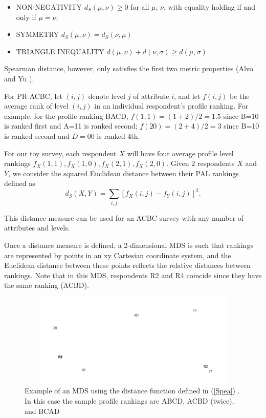 \documentclass[a4paper, 12pt]{article}
\begin{document}
\begin{itemize}
	\item NON-NEGATIVITY $d_S(\mu,\nu)\ge 0$ for all $\mu$, $\nu$, with equality holding if and only if $\mu=\nu$;
	\item SYMMETRY $d_S(\mu,\nu)=d_S(\nu,\mu)$ 
	\item TRIANGLE INEQUALITY $d(\mu,\nu)+d(\nu,\sigma)\ge d(\mu,\sigma)$.
\end{itemize}
{\flushleft Spearman distance}, however, only satisfies the first two metric properties (Alvo and Yu ).

 For PR-ACBC, let $(i,j)$ denote level $j$ of attribute $i$,  and let $f(i,j)$ be the average rank of level $(i,j)$ in an individual respondent's profile ranking. For example, for the profile ranking BACD, $f(1,1)=(1+2)/2=1.5$ since B=10 is ranked first and A=11 is ranked second; $f(20)=(2+4)/2=3$ since B=10 is ranked second and $D=00$ is ranked 4th.

 For our toy survey, each respondent $X$ will have four average profile level rankings $f_X(1,1), f_X(1,0), f_X(2,1), f_X(2,0)$.  Given 2 respondents $X$ and $Y$, we consider the squared Euclidean distance between their PAL rankings defined as
\begin{equation}
d_S(X,Y)=\sum_{i,j} [f_X(i,j)-f_Y(i,j)]^2.
\label{Spea}
\end{equation}

{\flushleft This} distance measure can be used for an ACBC survey with any number of attributes and levels.


Once a distance measure is defined, a 2-dimensional MDS is such that rankings are represented by points in an xy Cartesian coordinate system, and the Euclidean distance between these points reflects the relative distances between rankings.   
Note that in this MDS, respondents R2 and R4 coincide since they have the same ranking (ACBD).   

\begin{figure}[!htpb]
	\centering
	\includegraphics[width=6.5in, height=1.75in]{MDS1.png}
	\caption{Example of an MDS using the distance function defined in (\ref{Spea}) . In this case the sample profile rankings are ABCD, ACBD (twice), and BCAD}
	\label{AL}
\end{figure}
\end{document}
